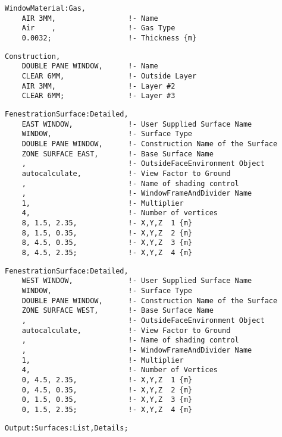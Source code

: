 \begin{lstlisting}
WindowMaterial:Gas,
    AIR 3MM,                 !- Name
    Air    ,                 !- Gas Type
    0.0032;                  !- Thickness {m}
\end{lstlisting}

\begin{lstlisting}
Construction,
    DOUBLE PANE WINDOW,      !- Name
    CLEAR 6MM,               !- Outside Layer
    AIR 3MM,                 !- Layer #2
    CLEAR 6MM;               !- Layer #3
\end{lstlisting}

\begin{lstlisting}
FenestrationSurface:Detailed,
    EAST WINDOW,             !- User Supplied Surface Name
    WINDOW,                  !- Surface Type
    DOUBLE PANE WINDOW,      !- Construction Name of the Surface
    ZONE SURFACE EAST,       !- Base Surface Name
    ,                        !- OutsideFaceEnvironment Object
    autocalculate,           !- View Factor to Ground
    ,                        !- Name of shading control
    ,                        !- WindowFrameAndDivider Name
    1,                       !- Multiplier
    4,                       !- Number of vertices
    8, 1.5, 2.35,            !- X,Y,Z  1 {m}
    8, 1.5, 0.35,            !- X,Y,Z  2 {m}
    8, 4.5, 0.35,            !- X,Y,Z  3 {m}
    8, 4.5, 2.35;            !- X,Y,Z  4 {m}
\end{lstlisting}

\begin{lstlisting}
FenestrationSurface:Detailed,
    WEST WINDOW,             !- User Supplied Surface Name
    WINDOW,                  !- Surface Type
    DOUBLE PANE WINDOW,      !- Construction Name of the Surface
    ZONE SURFACE WEST,       !- Base Surface Name
    ,                        !- OutsideFaceEnvironment Object
    autocalculate,           !- View Factor to Ground
    ,                        !- Name of shading control
    ,                        !- WindowFrameAndDivider Name
    1,                       !- Multiplier
    4,                       !- Number of Vertices
    0, 4.5, 2.35,            !- X,Y,Z  1 {m}
    0, 4.5, 0.35,            !- X,Y,Z  2 {m}
    0, 1.5, 0.35,            !- X,Y,Z  3 {m}
    0, 1.5, 2.35;            !- X,Y,Z  4 {m}
\end{lstlisting}

\begin{lstlisting}
Output:Surfaces:List,Details;
\end{lstlisting}

